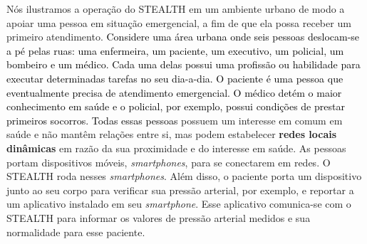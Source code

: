 \documentclass[12pt]{article}
\newcommand{\rev}[1]{\textcolor{black}{{#1}}}
\begin{document}
Nós ilustramos a operação do \mbox{STEALTH} em um ambiente urbano de modo a apoiar uma pessoa em situação emergencial, a fim de que ela possa receber um primeiro atendimento.
 \rev{Considere uma área urbana onde seis pessoas deslocam-se a pé pelas ruas: uma enfermeira, um paciente, um executivo, um policial, um bombeiro e um médico. Cada uma delas possui uma profissão ou habilidade para executar determinadas tarefas no seu dia-a-dia. O paciente é uma pessoa que eventualmente precisa de atendimento emergencial. O médico 
 detém o maior conhecimento em saúde e o policial, por exemplo, possui condições de prestar primeiros socorros.}
%
\rev{Todas essas pessoas} possuem um interesse em comum em saúde e não mantêm relações entre si, mas podem estabelecer
{\bf redes locais dinâmicas} em razão
da sua proximidade
e do interesse em saúde. 
As pessoas portam dispositivos móveis, \textit{smartphones}, para se conectarem em redes. O \mbox{STEALTH} roda nesses \textit{smartphones}. 
Além disso, o paciente porta um dispositivo junto ao seu corpo para verificar sua pressão arterial, por exemplo, e reportar a um aplicativo instalado em seu \textit{smartphone}. Esse aplicativo comunica-se com o \mbox{STEALTH} 
para informar 
os valores de pressão arterial medidos e sua normalidade para esse paciente.
\end{document}
